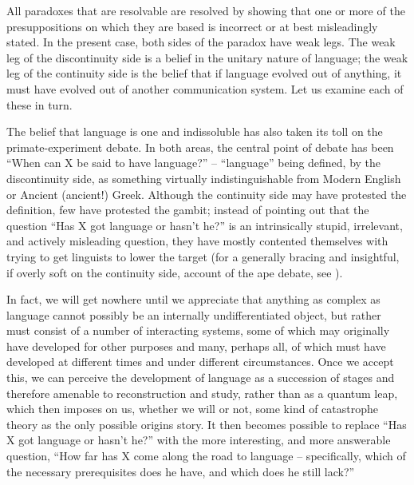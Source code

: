 All paradoxes that are resolvable are resolved by showing that one or more of the presuppositions on which they are based is incorrect or at best misleadingly stated. In the present case, both sides of the paradox have weak legs. The weak leg of the discontinuity side is a belief in the unitary nature of language; the weak leg of the continuity side is the belief that if language evolved out of anything, it must have evolved out of another communication system. Let us examine each of these in turn.

The belief that language is one and indissoluble has also taken its toll on the primate-experiment debate. In both areas, the central point of debate has been ``When can X be said to have language?'' -- ``language'' being defined, by the discontinuity side, as something virtually indistinguishable from Modern English or Ancient (ancient!) Greek. Although the continuity side may have protested the definition, few have protested the gambit; instead of pointing out that the question ``Has X got language or hasn't he?'' is an intrinsically stupid, irrelevant, and actively misleading question, they have mostly contented themselves with trying to get linguists to lower the target (for a generally bracing and insightful, if overly soft on the continuity side, account of the ape debate, see \citealt{Linden1974}).

In fact, we will get nowhere until we appreciate that anything as complex as language cannot possibly be an internally undifferentiated object, but rather must consist of a number of interacting systems,
some of which may originally have developed for other purposes and many, perhaps all, of which must have developed at different times and under different circumstances. Once we accept this, we can per\-ceive the development of language as a succession of stages and there\-fore amenable to reconstruction and study, rather than as a quantum leap, which then imposes on us, whether we will or not, some kind of catastrophe theory as the only possible origins story. It then becomes possible to replace ``Has X got language or hasn't he?'' with the more interesting, and more answerable question, ``How far has X come along the road to language -- specifically, which of the necessary pre\-requisites does he have, and which does he still lack?''

